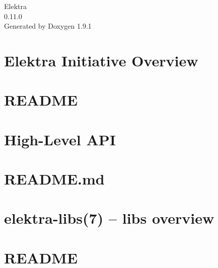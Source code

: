 \let\mypdfximage\pdfximage\def\pdfximage{\immediate\mypdfximage}\documentclass[twoside]{book}
\newcommand{\+}{\discretionary{\mbox{\scriptsize$\hookleftarrow$}}{}{}}
\newcommand{\clearemptydoublepage}{%
  \newpage{\pagestyle{empty}\cleardoublepage}%
}
\begin{document}
\raggedbottom

\hypersetup{pageanchor=false,
             bookmarksnumbered=true,
             pdfencoding=unicode
            }
\begin{titlepage}
\vspace*{7cm}
\begin{center}%
{\Large Elektra \\[1ex]\large 0.\+11.\+0 }\\
\vspace*{1cm}
{\large Generated by Doxygen 1.9.1}\\
\end{center}
\end{titlepage}
\clearemptydoublepage
{}
\tableofcontents
\clearemptydoublepage
{}
\hypersetup{pageanchor=true}

\chapter{Elektra Initiative Overview}
\label{index}\hypertarget{index}{}
\chapter{README}
\label{md_src_libs_elektra_README}

\chapter{High-\/\+Level API}
\label{src_libs_highlevel_README_md}

\chapter{README.\+md}
\label{src_libs_merge_README_md}

\chapter{elektra-\/libs(7) -- libs overview}
\label{src_libs_README_md}

\chapter{README}
\label{md_src_libs_template_README}

\end{document}
